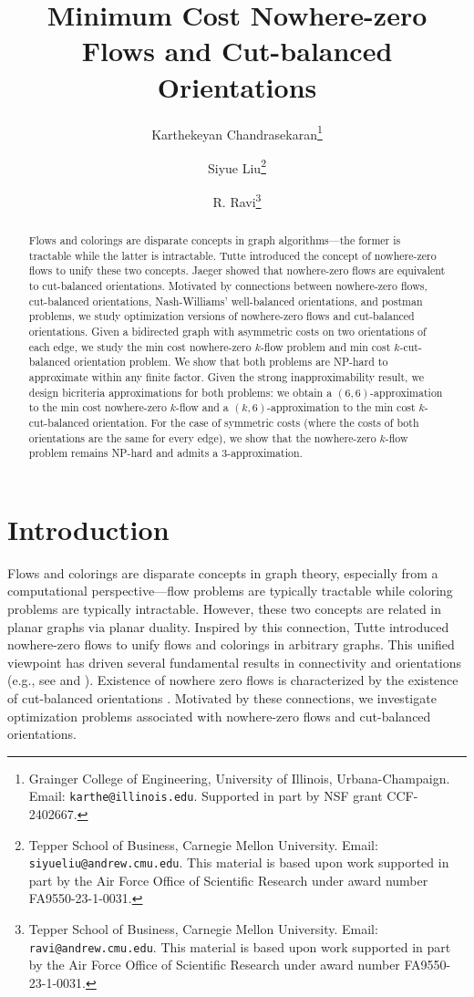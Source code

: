 \documentclass[11pt]{article}
\title{Minimum Cost Nowhere-zero Flows and Cut-balanced Orientations}
\author{Karthekeyan Chandrasekaran\thanks{Grainger College of Engineering, University of Illinois, Urbana-Champaign. Email: {\tt karthe@illinois.edu}. Supported in part by NSF grant CCF-2402667.}\and Siyue Liu\thanks{Tepper School of Business, Carnegie Mellon University. Email: {\tt siyueliu@andrew.cmu.edu}. This material is based upon work supported in part by the Air Force Office of
Scientific Research under award number FA9550-23-1-0031.}
\and R. Ravi\thanks{Tepper School of Business, Carnegie Mellon University. Email: {\tt ravi@andrew.cmu.edu}. This material is based upon work supported in part by the Air Force Office of
Scientific Research under award number FA9550-23-1-0031.}
}
\date{}
\begin{document}
\maketitle

\begin{abstract}
Flows and colorings are disparate concepts in graph algorithms---the former is tractable while the latter is intractable. Tutte \cite{tutte1954contribution, tutte1966algebraic} introduced the concept of nowhere-zero flows to unify these two concepts. Jaeger \cite{jaeger1976balanced} showed that nowhere-zero flows are equivalent to cut-balanced orientations. 
Motivated by connections between nowhere-zero flows, cut-balanced orientations, Nash-Williams' well-balanced orientations, and postman problems, we study optimization versions of nowhere-zero flows and cut-balanced orientations. 
Given a bidirected graph with asymmetric costs on two orientations of each edge, we study the min cost nowhere-zero $k$-flow problem and min cost $k$-cut-balanced orientation problem. We show that both problems are NP-hard to approximate within any finite factor. Given the strong inapproximability result, we design bicriteria approximations for both problems: we obtain a $(6,6)$-approximation to the min cost nowhere-zero $k$-flow and a $(k,6)$-approximation to the min cost $k$-cut-balanced orientation.
For the case of symmetric costs (where the costs of both orientations are the same for every edge), we show that the nowhere-zero $k$-flow problem remains NP-hard and admits a $3$-approximation. 
\end{abstract}

\newpage
\section{Introduction}\label{sec:intro}
Flows and colorings are disparate concepts in graph theory, especially from a computational perspective---flow problems are typically tractable while coloring problems are typically intractable. However, these two concepts are related in planar graphs via planar duality. 
Inspired by this connection, Tutte \cite{tutte1954contribution,tutte1966algebraic} introduced nowhere-zero flows to unify flows and colorings in arbitrary graphs. This unified viewpoint has driven several fundamental results in connectivity and orientations (e.g., see \cite{west2001introduction} and \cite{CLR24}). Existence of nowhere zero flows is characterized by the existence of cut-balanced orientations \cite{jaeger1976balanced}. Motivated by these connections, we investigate optimization problems associated with nowhere-zero flows and cut-balanced orientations.
\end{document}
